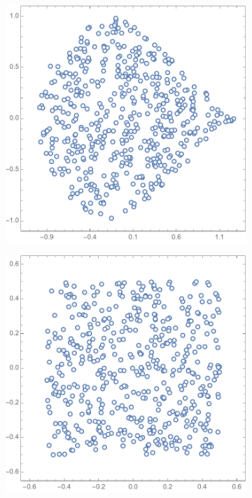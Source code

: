 \documentclass[letter]{article}
\begin{document}
\begin{enumerate}
\begin{figure}[h!]
     \centering
     \begin{subfigure}[b]{0.3\textwidth}
         \centering
         \includegraphics[width=\textwidth]{asym.pdf}
         \caption{}
         \label{fig:asym}
     \end{subfigure}
     \hfill
     \begin{subfigure}[b]{0.3\textwidth}
         \centering
         \includegraphics[width=\textwidth]{sqr.pdf}

\end{subfigure}
\end{figure}
\end{enumerate}
\end{document}
